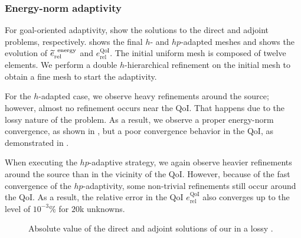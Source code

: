 \subsubsection{Energy-norm adaptivity}

For goal-oriented adaptivity,  show the solutions to the direct and adjoint problems, respectively.  shows the final $h$- and $hp$-adapted meshes and  shows the evolution of $\tilde{e}_{\textrm{rel}}^{\textrm{\, energy}}$ and $e_{\textrm{rel}}^{\textrm{QoI}}$. The initial uniform mesh is composed of twelve  elements. We perform a double $h$-hierarchical refinement on the initial mesh to obtain a fine mesh to start the adaptivity.

For the $h$-adapted case, we observe heavy refinements around the source; however, almost no refinement occurs near the QoI. That happens due to the lossy nature of the problem. As a result, we observe a proper energy-norm convergence, as shown in  , but a poor convergence behavior in the QoI, as demonstrated in  .

When executing the $hp$-adaptive strategy, we again observe heavier refinements around the source than in the vicinity of the QoI. However, because of the fast convergence of the $hp$-adaptivity, some non-trivial refinements still occur around the QoI. As a result, the relative error in the QoI $e_{\textrm{rel}}^{\textrm{QoI}}$ also converges up to the level of $10^{-3} \%$ for $20$k unknowns.

\pagebreak

\begin{figure}
  \caption{Absolute value of the direct and adjoint solutions of our  in a lossy .}
\end{figure}

